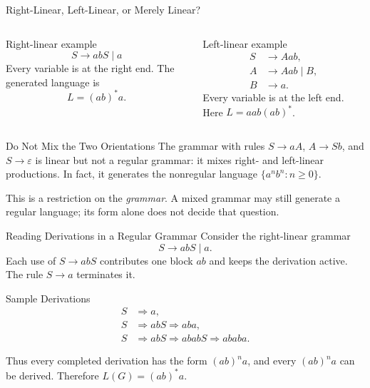 \documentclass[10pt]{beamer}
\begin{document}
\begin{frame}{Right-Linear, Left-Linear, or Merely Linear?}
  \small
  \begin{columns}[T]
    \begin{block}{Right-linear example}
      \[
        S \rightarrow abS \mid a
      \]
      Every variable is at the right end. The generated language is
      \[
        L=(ab)^{*}a.
      \]
    \end{block}

    \begin{block}{Left-linear example}
      \[
        \begin{aligned}
          S&\rightarrow Aab,\\
          A&\rightarrow Aab \mid B,\\
          B&\rightarrow a.
        \end{aligned}
      \]
      Every variable is at the left end. Here
      $L=aab(ab)^{*}$.
    \end{block}
  \end{columns}
  \pause
  \begin{alertblock}{Do Not Mix the Two Orientations}
    The grammar with rules $S\rightarrow aA$, $A\rightarrow Sb$, and
    $S\rightarrow\varepsilon$ is linear but not a regular grammar: it mixes
    right- and left-linear productions. In fact, it generates the nonregular
    language $\{a^n b^n:n\geq 0\}$.
  \end{alertblock}
  This is a restriction on the \emph{grammar}. A mixed grammar may still
  generate a regular language; its form alone does not decide that question.
\end{frame}

\begin{frame}{Reading Derivations in a Regular Grammar}
  Consider the right-linear grammar
  \[
    S\rightarrow abS \mid a.
  \]
  \pause
  Each use of $S\rightarrow abS$ contributes one block $ab$ and keeps the
  derivation active. The rule $S\rightarrow a$ terminates it.
  \begin{exampleblock}{Sample Derivations}
    \[
      \begin{aligned}
        S &\Rightarrow a,\\
        S &\Rightarrow abS \Rightarrow aba,\\
        S &\Rightarrow abS \Rightarrow ababS \Rightarrow ababa.
      \end{aligned}
    \]
  \end{exampleblock}
  \pause
  Thus every completed derivation has the form $(ab)^{n}a$, and every
  $(ab)^{n}a$ can be derived. Therefore $L(G)=(ab)^{*}a$.
\end{frame}
\end{document}

